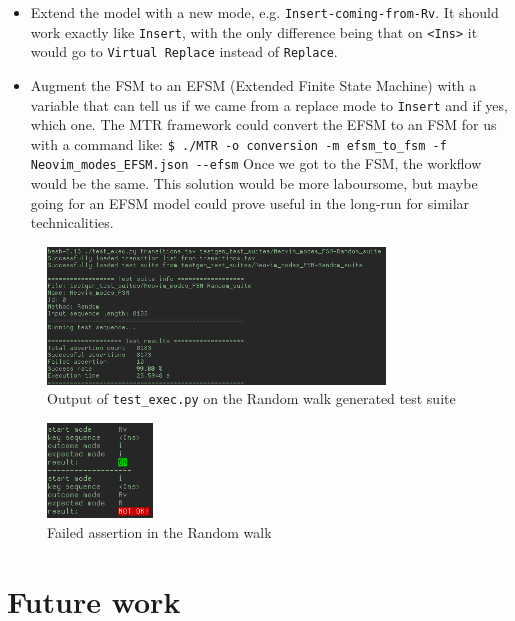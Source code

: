 \documentclass[12pt]{article}
\begin{document}
		\begin{itemize}
			\item{Extend the model with a new mode, e.g. \verb|Insert-coming-from-Rv|. It should work exactly like \verb|Insert|, with the only difference being that on \verb|<Ins>| it would go to \verb|Virtual Replace| instead of \verb|Replace|.}
			\item{Augment the FSM to an EFSM (Extended Finite State Machine) with a variable that can tell us if we came from a replace mode to \verb|Insert| and if yes, which one. The MTR framework could convert the EFSM to an FSM for us with a command like: \verb|$ ./MTR -o conversion -m efsm_to_fsm -f Neovim_modes_EFSM.json --efsm| Once we got to the FSM, the workflow would be the same. This solution would be more laboursome, but maybe going for an EFSM model could prove useful in the long-run for similar technicalities.}
		\end{itemize}

		\begin{figure}[!h]
			\centering
			\includegraphics[width=0.8\textwidth]{images/test_exec_run_Random.png}
			\caption{Output of \texttt{test\_exec.py} on the Random walk generated test suite}
		\end{figure}

		\begin{figure}[!h]
			\centering
			\includegraphics[width=0.25\textwidth]{images/test_exec_NOT_OK.png}
			\caption{Failed assertion in the Random walk}
		\end{figure}

		\newpage

\section{Future work}
\end{document}
